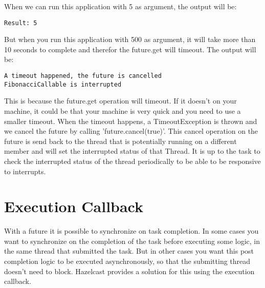 When we can run this application with 5 as argument, the output will be: 
\begin{lstlisting}
Result: 5
\end{lstlisting}
But when you run this application with 500 as argument, it will take more than 10 seconds to complete and therefor the future.get will timeout. The output will be:
\begin{lstlisting}
A timeout happened, the future is cancelled
FibonacciCallable is interrupted
\end{lstlisting}
This is because the future.get operation will timeout. If it doesn't on your machine, it could be that your machine is very quick and you need to use a smaller timeout. When the timeout happens, a TimeoutException is thrown and we cancel the future by calling 'future.cancel(true)'. This cancel operation on the future is send back to the thread that is potentially running on a different member and will set the interrupted status of that Thread. It is up to the task to check the interrupted status of the thread periodically to be able to be responsive to interrupts.

\section{Execution Callback}
With a future it is possible to synchronize on task completion. In some cases you want to synchronize on the completion of the task before executing some logic, in the same thread that submitted the task. But in other cases you want this post completion logic to be executed asynchronously, so that the submitting thread doesn't need to block. Hazelcast provides a solution for this using the execution callback.

